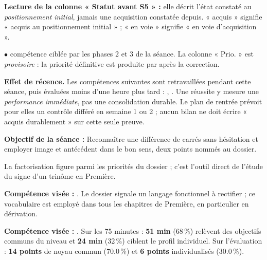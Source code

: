 \documentclass[10pt,a4paper]{article}
\begin{document}
\par\vspace{1mm}\small\textbf{Lecture de la colonne « Statut avant S5 » :} elle décrit l'état constaté au \emph{positionnement initial}, jamais une acquisition constatée depuis. « acquis » signifie « acquis au positionnement initial » ; « en voie » signifie « en voie d'acquisition ».
\par\small$\bullet$ compétence ciblée par les phases 2 et 3 de la séance. La colonne « Prio. » est \emph{provisoire} : la priorité définitive est produite par  après la correction.
\begin{warningbox}\textbf{Effet de récence.} Les compétences suivantes sont retravaillées pendant cette séance, puis évaluées moins d'une heure plus tard : , . Une réussite y mesure une \emph{performance immédiate}, pas une consolidation durable. Le plan de rentrée prévoit pour elles un contrôle différé en semaine 1 ou 2 ; aucun bilan ne doit écrire « acquis durablement » sur cette seule preuve.\end{warningbox}
\begin{goalbox}\textbf{Objectif de la séance :} Reconnaître une différence de carrés sans hésitation et employer image et antécédent dans le bon sens, deux points nommés au dossier.\end{goalbox}
La factorisation figure parmi les priorités du dossier ; c'est l'outil direct de l'étude du signe d'un trinôme en Première.
\par\vspace{1mm}\textbf{Compétence visée :} .
Le dossier signale un langage fonctionnel à rectifier ; ce vocabulaire est employé dans tous les chapitres de Première, en particulier en dérivation.
\par\vspace{1mm}\textbf{Compétence visée :} .
Sur les 75 minutes : \textbf{51 min} (68\,\%) relèvent des objectifs communs du niveau et \textbf{24 min} (32\,\%) ciblent le profil individuel. Sur l'évaluation : \textbf{14 points} de noyau commun (70.0\,\%) et \textbf{6 points} individualisés (30.0\,\%).
\newpage{}
\end{document}
